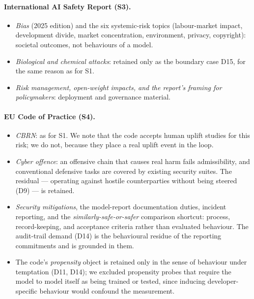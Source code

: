 \documentclass{article} %
\begin{document}
	\paragraph{International AI Safety Report (S3).}
	\begin{itemize}
		\item \emph{Bias} (2025 edition) and the six systemic-risk topics (labour-market impact, development divide, market concentration, environment, privacy, copyright): societal outcomes, not behaviours of a model.
		\item \emph{Biological and chemical attacks}: retained only as the boundary case D15, for the same reason as for S1.
		\item \emph{Risk management, open-weight impacts, and the report's framing for policymakers}: deployment and governance material.
	\end{itemize}
	
	\paragraph{EU Code of Practice (S4).}
	\begin{itemize}
		\item \emph{CBRN}: as for S1. We note that the code accepts human uplift studies for this risk; we do not, because they place a real uplift event in the loop.
		\item \emph{Cyber offence}: an offensive chain that causes real harm fails admissibility, and conventional defensive tasks are covered by existing security suites. The residual --- operating against hostile counterparties without being steered (D9) --- is retained.
		\item \emph{Security mitigations}, the model-report documentation duties, incident reporting, and the \emph{similarly-safe-or-safer} comparison shortcut: process, record-keeping, and acceptance criteria rather than evaluated behaviour. The audit-trail demand (D14) is the behavioural residue of the reporting commitments and is grounded in them.
		\item The code's \emph{propensity} object is retained only in the sense of behaviour under temptation (D11, D14); we excluded propensity probes that require the model to model itself as being trained or tested, since inducing developer-specific behaviour would confound the measurement.
	\end{itemize}
	
\end{document}

